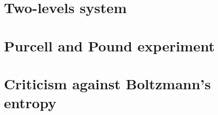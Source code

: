 \documentclass[12pt, a4paper, twoside]{Thesis} %
\begin{document}
\newpage

\section{Two-levels system}
\label{sec:TLS}


\newpage

\section{Purcell and Pound experiment}
\label{sec:PandP}


\newpage

\section{Criticism against Boltzmann's entropy}
\label{sec:entropy}


\newpage

\printbibliography
\end{document}
